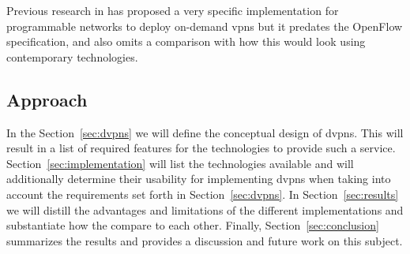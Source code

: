 	Previous research in \cite{net-prog-vpn} has proposed a very specific implementation for programmable networks to deploy on-demand \acp{vpn} but it predates the OpenFlow specification, and also omits a comparison with how this would look using contemporary technologies.


	\subsection{Approach} %
	\label{sub:approach}
	In the Section~\ref{sec:dvpns} we will define the conceptual design of \acp{dvpn}. This will result in a list of required features for the technologies to provide such a service. Section~\ref{sec:implementation} will list the technologies available and will additionally determine their usability for implementing \acp{dvpn} when taking into account the requirements set forth in Section~\ref{sec:dvpns}. In Section~\ref{sec:results} we will distill the advantages and limitations of the different implementations and substantiate how the compare to each other. Finally, Section~\ref{sec:conclusion} summarizes the results and provides a discussion and future work on this subject.


